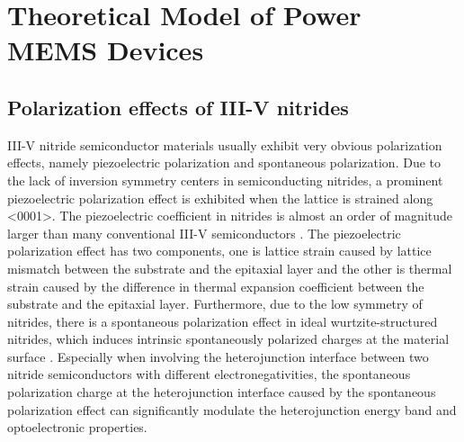 
\chapter{Theoretical Model of Power MEMS Devices}
\label{ch:Theoretical Models of MEMS Cantilever Devices based on AlGaN/AlN/GaN Heterostructure}

\ifpdf
    \graphicspath{{Chapter2/Figs/Raster/}{Chapter2/Figs/PDF/}{Chapter2/Figs/}}
\else
    \graphicspath{{Chapter2/Figs/Vector/}{Chapter2/Figs/}}
\fi



\section{Polarization effects of III-V nitrides}
\label{sec:Polarization effect of III-V nitrides}

III-V nitride  semiconductor materials usually exhibit very obvious polarization  effects, namely piezoelectric polarization  and  spontaneous polarization. Due to the lack of inversion symmetry centers in semiconducting nitrides, a prominent piezoelectric polarization effect is exhibited when the lattice is strained  along <0001>. The piezoelectric coefficient  in nitrides is almost an order of magnitude larger than many conventional III-V semiconductors \cite{bykhovski1993influence,bykhovski1997elastic,gualtieri1994piezoelectric,o1973acoustic}. The piezoelectric polarization effect has two components, one is lattice strain  caused by lattice mismatch  between the substrate  and the epitaxial layer  and the other is thermal strain caused by the difference in thermal expansion coefficient between the substrate  and the  epitaxial layer. Furthermore, due to the low symmetry of nitrides, there is a spontaneous polarization  effect in ideal  wurtzite-structured nitrides, which induces intrinsic spontaneously polarized charges at the material  surface \cite{resta1994macroscopic,king1993theory}. Especially when involving the heterojunction interface  between two nitride semiconductors with different  electronegativities, the spontaneous polarization charge at the heterojunction interface caused by the spontaneous polarization effect can significantly modulate the heterojunction energy band  and optoelectronic properties.

